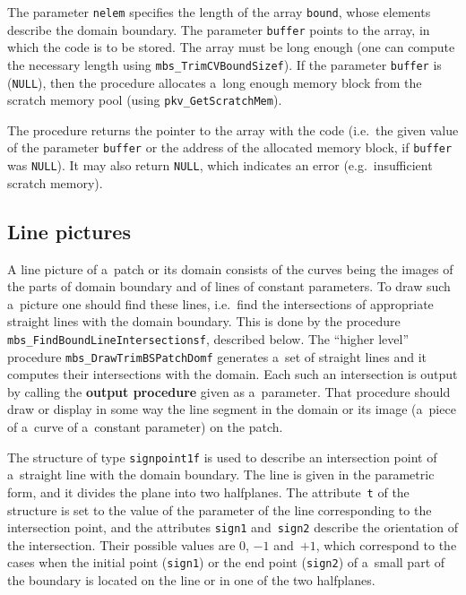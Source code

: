 The parameter \texttt{nelem} specifies the length of the array \texttt{bound},
whose elements describe the domain boundary. The parameter \texttt{buffer}
points to the array, in which the code is to be stored. The array must be
long enough (one can compute the necessary length using
\texttt{mbs\_TrimCVBoundSizef}). If the parameter
\texttt{buffer} is (\texttt{NULL}),
then the procedure allocates a~long enough memory block from the scratch
memory pool (using \texttt{pkv\_GetScratchMem}).

The procedure returns the pointer to the array with the code
(i.e.\ the given value of the parameter \texttt{buffer} or the address
of the allocated memory block, if \texttt{buffer} was \texttt{NULL}).
It may also return \texttt{NULL}, which indicates an error
(e.g.\ insufficient scratch memory).


\subsection{Line pictures}

\begin{sloppypar}
A line picture of a~patch or its domain consists of the curves being the
images of the parts of domain boundary and of lines of constant parameters.
To draw such a~picture one should find these lines, i.e.\ find the
intersections of appropriate straight lines with the domain boundary.
This is done by the procedure \texttt{mbs\_FindBoundLineIntersectionsf},
described below. The ``higher level'' procedure
\texttt{mbs\_DrawTrimBSPatchDomf} generates a~set of straight lines
and it computes their intersections with the domain.
Each such an intersection is output by calling the \textbf{output procedure}
given as a~parameter. That procedure should draw or display in some way
the line segment in the domain or its image (a~piece of a~curve of a~constant
parameter) on the patch.
\end{sloppypar}

\vspace{\bigskipamount}
The structure of type \texttt{signpoint1f} is used to describe an
intersection point of a~straight line with the domain boundary.
The line is given in the parametric form, and it divides the plane
into two halfplanes. The attribute~\texttt{t} of the structure
is set to the value of the parameter of the line corresponding to
the intersection point, and the attributes \texttt{sign1} and~\texttt{sign2}
describe the orientation of the intersection. Their possible values are
$0$, $-1$ and~$+1$, which correspond to the cases when the initial point
(\texttt{sign1}) or the end point (\texttt{sign2}) of a~small part of the
boundary is located on the line or in one of the two halfplanes.

